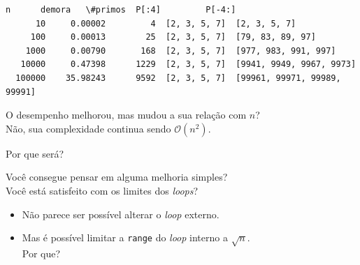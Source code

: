 \documentclass[11pt,a4paper]{article}
\providecommand{\tightlist}{%
      \setlength{\itemsep}{0pt}\setlength{\parskip}{0pt}}
\begin{document}
    \begin{Verbatim}[commandchars=\\\{\}]
       n      demora   \#primos  P[:4]         P[-4:]
      10     0.00002         4  [2, 3, 5, 7]  [2, 3, 5, 7]
     100     0.00013        25  [2, 3, 5, 7]  [79, 83, 89, 97]
    1000     0.00790       168  [2, 3, 5, 7]  [977, 983, 991, 997]
   10000     0.47398      1229  [2, 3, 5, 7]  [9941, 9949, 9967, 9973]
  100000    35.98243      9592  [2, 3, 5, 7]  [99961, 99971, 99989, 99991]

    \end{Verbatim}

    O desempenho melhorou, mas mudou a sua relação com \(n\)?\\
Não, sua complexidade continua sendo \(\mathcal{O}(n^2)\).

Por que será?

    Você consegue pensar em alguma melhoria simples?\\
Você está satisfeito com os limites dos \emph{loops}?

    \begin{itemize}
\tightlist
\item
  Não parece ser possível alterar o \emph{loop} externo.
\item
  Mas é possível limitar a \texttt{range} do \emph{loop} interno a
  \(\sqrt{n}\).\\
  Por que?
\end{itemize}
\end{document}
